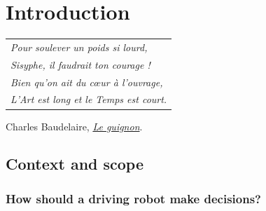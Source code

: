 
\graphicspath{{2-Chapters/1-Chapter/}}

\chapter{Introduction}
\label{chapter:1}

\begin{flushright}
	\begin{tabular}{@{}l@{}}
		\emph{Pour soulever un poids si lourd,}\\
		\emph{Sisyphe, il faudrait ton courage !}\\
		\emph{Bien qu’on ait du cœur à l’ouvrage,}\\
		\emph{L’Art est long et le Temps est court.}\\
	\end{tabular}

	Charles Baudelaire, \href{https://eleurent.github.io/sisyphe/texts/le-guignon.html}{\emph{Le guignon}}.
\end{flushright}

\section{Context and scope}


\subsection{How should a driving robot make decisions?}

